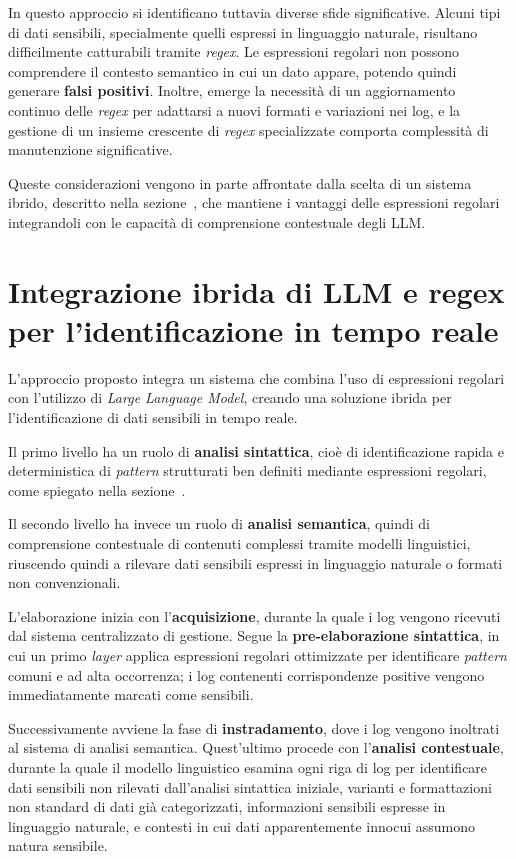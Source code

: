 \documentclass[12pt,twoside]{report}
\begin{document}
In questo approccio si identificano tuttavia diverse sfide significative. Alcuni tipi di dati sensibili, specialmente quelli espressi in linguaggio naturale, risultano difficilmente catturabili tramite \textit{regex}. Le espressioni regolari non possono comprendere il contesto semantico in cui un dato appare, potendo quindi generare \textbf{falsi positivi}. Inoltre, emerge la necessità di un aggiornamento continuo delle \textit{regex} per adattarsi a nuovi formati e variazioni nei log, e la gestione di un insieme crescente di \textit{regex} specializzate comporta complessità di manutenzione significative.

Queste considerazioni vengono in parte affrontate dalla scelta di un sistema ibrido, descritto nella sezione~, che mantiene i vantaggi delle espressioni regolari integrandoli con le capacità di comprensione contestuale degli LLM.

\section{Integrazione ibrida di LLM e regex per l'identificazione in tempo reale}
\label{sec:ibrido_llm_regex}

L'approccio proposto integra un sistema che combina l'uso di espressioni regolari con l'utilizzo di \textit{Large Language Model}, creando una soluzione ibrida per l'identificazione di dati sensibili in tempo reale.

Il primo livello ha un ruolo di \textbf{analisi sintattica}, cioè di identificazione rapida e deterministica di \textit{pattern} strutturati ben definiti mediante espressioni regolari, come spiegato nella sezione~.

Il secondo livello ha invece un ruolo di \textbf{analisi semantica}, quindi di comprensione contestuale di contenuti complessi tramite modelli linguistici, riuscendo quindi a rilevare dati sensibili espressi in linguaggio naturale o formati non convenzionali.

L'elaborazione inizia con l'\textbf{acquisizione}, durante la quale i log vengono ricevuti dal sistema centralizzato di gestione. Segue la \textbf{pre-elaborazione sintattica}, in cui un primo \textit{layer} applica espressioni regolari ottimizzate per identificare \textit{pattern} comuni e ad alta occorrenza; i log contenenti corrispondenze positive vengono immediatamente marcati come sensibili.

Successivamente avviene la fase di \textbf{instradamento}, dove i log vengono inoltrati al sistema di analisi semantica. Quest'ultimo procede con l'\textbf{analisi contestuale}, durante la quale il modello linguistico esamina ogni riga di log per identificare dati sensibili non rilevati dall'analisi sintattica iniziale, varianti e formattazioni non standard di dati già categorizzati, informazioni sensibili espresse in linguaggio naturale, e contesti in cui dati apparentemente innocui assumono natura sensibile.
\end{document}

